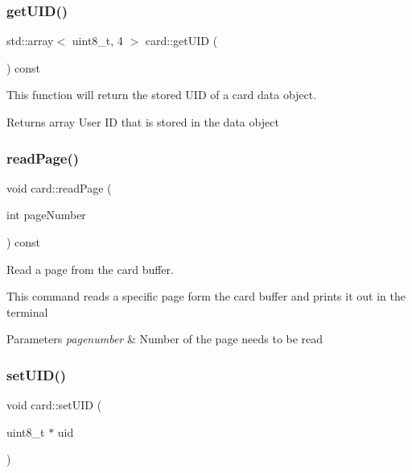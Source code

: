 \subsubsection{\texorpdfstring{get\+U\+I\+D()}{getUID()}}
{\footnotesize\ttfamily std\+::array$<$ uint8\+\_\+t, 4 $>$ card\+::get\+U\+ID (\begin{DoxyParamCaption}{ }\end{DoxyParamCaption}) const}



This function will return the stored U\+ID of a card data object. 

\begin{DoxyReturn}{Returns}
array User ID that is stored in the data object 
\end{DoxyReturn}
\mbox{\label{classcard_a94c174b824e03f95a8c6c460fde5cc05}} 
\subsubsection{\texorpdfstring{read\+Page()}{readPage()}}
{\footnotesize\ttfamily void card\+::read\+Page (\begin{DoxyParamCaption}\item[{int}]{page\+Number }\end{DoxyParamCaption}) const}



Read a page from the card buffer. 

This command reads a specific page form the card buffer and prints it out in the terminal 
\begin{DoxyParams}{Parameters}
{\em pagenumber} & Number of the page needs to be read \\
\hline
\end{DoxyParams}
\mbox{\label{classcard_af5b0f2fc4fe0a5c1c05bdac63580a560}} 
\subsubsection{\texorpdfstring{set\+U\+I\+D()}{setUID()}\hspace{0.1cm}{\footnotesize\ttfamily [1/2]}}
{\footnotesize\ttfamily void card\+::set\+U\+ID (\begin{DoxyParamCaption}\item[{uint8\+\_\+t $\ast$}]{uid }\end{DoxyParamCaption})}




